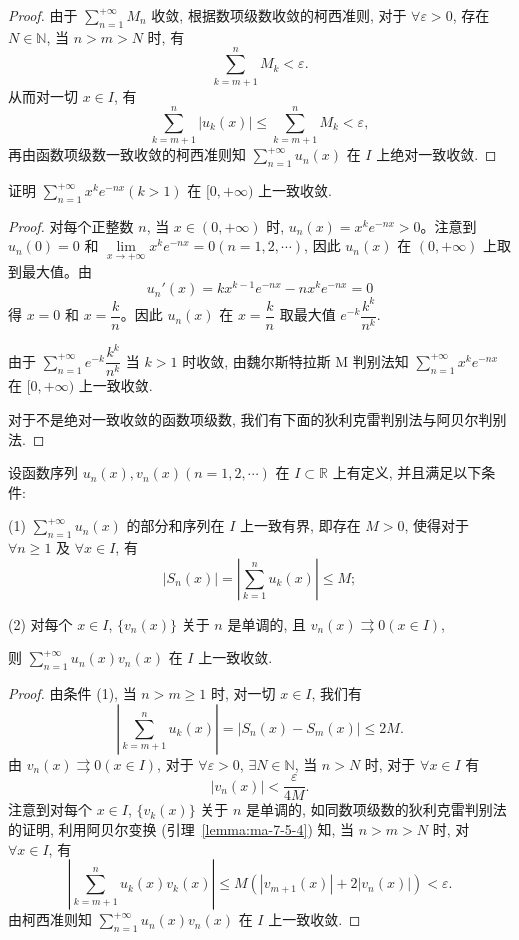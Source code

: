 \begin{proof}
由于 $\sum\limits_{n=1}^{+\infty}M_n$ 收敛, 根据数项级数收敛的柯西准则, 对于 $\forall\varepsilon>0$, 存在 $N\in\mathbb N$, 当 $n>m>N$ 时, 有
\[
  \sum_{k=m+1}^n M_k<\varepsilon.
\]
从而对一切 $x\in I$, 有
\[
  \sum_{k=m+1}^n |u_k(x)|\leq\sum_{k=m+1}^n M_k<\varepsilon,
\]
再由函数项级数一致收敛的柯西准则知 $\sum\limits_{n=1}^{+\infty}u_n(x)$ 在 $I$ 上绝对一致收敛.
\end{proof}


\begin{example}\label{example:ma-10-3-5}
证明 $\sum\limits_{n=1}^{+\infty}x^ke^{-nx}(k>1)$ 在 $[0,+\infty)$ 上一致收敛.
\end{example}


\begin{proof}
对每个正整数 $n$, 当 $x\in(0,+\infty)$ 时, $u_n(x)=x^ke^{-nx}>0$。注意到 $u_n(0)=0$ 和 $\lim\limits_{x\to+\infty}x^ke^{-nx}=0(n=1,2,\cdots)$, 因此 $u_n(x)$ 在 $(0,+\infty)$ 上取到最大值。由
\[
  u_n'(x)=kx^{k-1}e^{-nx}-nx^ke^{-nx}=0
\]
得 $x=0$ 和 $x=\dfrac{k}{n}$。因此 $u_n(x)$ 在 $x=\dfrac{k}{n}$ 取最大值 $e^{-k}\dfrac{k^k}{n^k}$.

由于 $\sum\limits_{n=1}^{+\infty}e^{-k}\dfrac{k^k}{n^k}$ 当 $k>1$ 时收敛, 由魏尔斯特拉斯 M 判别法知 $\sum\limits_{n=1}^{+\infty}x^ke^{-nx}$ 在 $[0,+\infty)$ 上一致收敛.

对于不是绝对一致收敛的函数项级数, 我们有下面的狄利克雷判别法与阿贝尔判别法.
\end{proof}


\begin{theorem}[{狄利克雷判别法}]\label{theorem:ma-10-3-4}
设函数序列 $u_n(x),v_n(x)(n=1,2,\cdots)$ 在 $I\subset\mathbb R$ 上有定义, 并且满足以下条件:

(1) $\sum\limits_{n=1}^{+\infty}u_n(x)$ 的部分和序列在 $I$ 上一致有界, 即存在 $M>0$, 使得对于 $\forall n\geq1$ 及 $\forall x\in I$, 有
\[
  |S_n(x)|=\left|\sum_{k=1}^n u_k(x)\right|\leq M;
\]

(2) 对每个 $x\in I$, $\{v_n(x)\}$ 关于 $n$ 是单调的, 且 $v_n(x)\rightrightarrows0(x\in I)$,

则 $\sum\limits_{n=1}^{+\infty}u_n(x)v_n(x)$ 在 $I$ 上一致收敛.
\end{theorem}


\begin{proof}
由条件 (1), 当 $n>m\geq1$ 时, 对一切 $x\in I$, 我们有
\[
  \left|\sum_{k=m+1}^n u_k(x)\right|=|S_n(x)-S_m(x)|\leq2M.
\]
由 $v_n(x)\rightrightarrows0(x\in I)$, 对于 $\forall\varepsilon>0$, $\exists N\in\mathbb N$, 当 $n>N$ 时, 对于 $\forall x\in I$ 有
\[
  |v_n(x)|<\frac{\varepsilon}{4M}.
\]
注意到对每个 $x\in I$, $\{v_k(x)\}$ 关于 $n$ 是单调的, 如同数项级数的狄利克雷判别法的证明, 利用阿贝尔变换 (引理~\ref{lemma:ma-7-5-4}) 知, 当 $n>m>N$ 时, 对 $\forall x\in I$, 有
\[
  \left|\sum_{k=m+1}^n u_k(x)v_k(x)\right|
  \leq M(|v_{m+1}(x)|+2|v_n(x)|)<\varepsilon.
\]
由柯西准则知 $\sum\limits_{n=1}^{+\infty}u_n(x)v_n(x)$ 在 $I$ 上一致收敛.
\end{proof}



